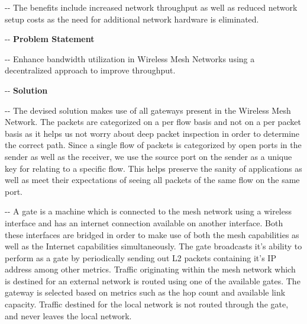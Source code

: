 \documentclass[12pt]{article}
\makeatletter
\newenvironment{indentation}[3]%
	{\par\setlength{\parindent}{#3}
	\setlength{\leftmargin}{#1}       \setlength{\rightmargin}{#1}%
	\advance\linewidth -\leftmargin       \advance\linewidth -\rightmargin%
	\advance\@totalleftmargin\leftmargin  \@setpar{{\@@par}}%
	\parshape 1\@totalleftmargin \linewidth\ignorespaces}{\par}%
\makeatother
\begin{document}
\begin{indentation}{0pt}{0pt}{0pt}
{\normalsize \hspace{1cm}The benefits include increased network throughput as well as reduced network setup costs as the need for additional network hardware is eliminated.}
\end{indentation}

\begin{indentation}{0pt}{0pt}{0pt}
\vspace{1cm}
\textbf{{{\Large Problem Statement}}}
\end{indentation}
\vspace{0.5cm}

\begin{indentation}{0pt}{0pt}{0pt}
{\normalsize \hspace{1cm} Enhance bandwidth utilization in Wireless Mesh Networks using a decentralized approach to improve throughput.}
\end{indentation}

\begin{indentation}{0pt}{0pt}{0pt}
\vspace{1cm}
\pagebreak
\textbf{{{\Large Solution}}}
\end{indentation}
\vspace{0.5cm}
\begin{indentation}{0pt}{0pt}{0pt}
{\normalsize \hspace{1cm} The devised solution makes use of all gateways present in the Wireless Mesh Network. The packets are categorized on a per flow basis and not on a per packet basis as it helps us not worry about deep packet inspection in order to determine the correct path. Since a single flow of packets is categorized by open ports in the sender as well as the receiver, we use the source port on the sender as a unique key for relating to a specific flow. This helps preserve the sanity of applications as well as meet their expectations of seeing all packets of the same flow on the same port.}
\end{indentation}


\begin{indentation}{0pt}{0pt}{0pt}
{\normalsize \hspace{1cm} A gate is a machine which is connected to the mesh network using a wireless interface and has an internet connection available on another interface. Both these interfaces are bridged in order to make use of both the mesh capabilities as well as the Internet capabilities simultaneously. The gate broadcasts it's ability to perform as a gate by periodically sending out L2 packets containing it's IP address among other metrics. Traffic originating within the mesh network which is destined for an external network is routed using one of the available gates. The gateway is selected based on metrics such as the hop count and available link capacity. Traffic destined for the local network is not routed through the gate, and never leaves the local network.} 
\end{indentation}
\end{document}
